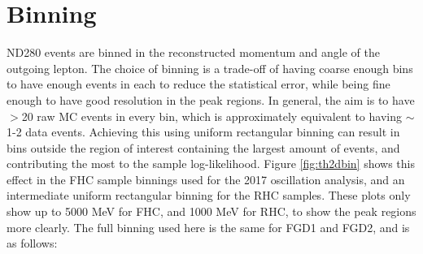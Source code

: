 \section{Binning}\label{sec:binning}

ND280 events are binned in the reconstructed momentum and angle of the outgoing lepton. The choice of binning is a trade-off of having coarse enough bins to have enough events in each to reduce the statistical error, while being fine enough to have good resolution in the peak regions. In general, the aim is to have $>$20 raw MC events in every bin, which is approximately equivalent to having $\sim$1-2 data events. Achieving this using uniform rectangular binning can result in bins outside the region of interest containing the largest amount of events, and contributing the most to the sample log-likelihood. Figure \ref{fig:th2dbin} shows this effect in the FHC sample binnings used for the 2017 oscillation analysis, and an intermediate uniform rectangular binning for the RHC samples. These plots only show up to 5000 MeV for FHC, and 1000 MeV for RHC, to show the peak regions more clearly. The full binning used here is the same for FGD1 and FGD2, and is as follows:

